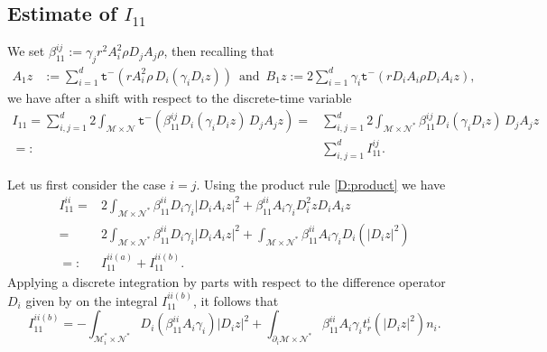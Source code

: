 \documentclass[11pt,oneside,leqno]{amsart}
\numberwithin{equation}{section}
\numberwithin{equation}{section}
\newcommand{\trm}{\mathtt t^-}
\begin{document}
\subsection{Estimate of $I_{11}$ }
We set $\beta_{11}^{ij}:=\gamma_{j}r^{2}A_{i}^{2}\rho D_{j}A_{j}\rho$, then recalling that
\begin{equation*}
    \begin{split}
        A_{1}z&:=\sum_{i=1}^{d}\trm(rA_{i}^{2}\rho\,D_{i}(\gamma_{i}D_{i}z))\, \text{ and }\,B_{1}z:=2\sum_{i=1}^{d}\gamma_{i}\trm(rD_{i}A_{i}\rho D_{i}A_{i}z),
    \end{split}
\end{equation*}
we have after a shift with respect to the discrete-time variable
\begin{equation*}
    \begin{split}
     I_{11}=\sum_{i,j= 1}^{d}2\int_{\mathcal{M}\times\mathcal{N}} \trm(\beta_{11}^{ij}D_{i}(\gamma_{i}D_{i}z)\,D_{j}A_{j}z)=&\sum_{i,j=1}^{d}2\int_{\mathcal{M}\times\mathcal{N}^{\ast}} \beta_{11}^{ij}D_{i}(\gamma_{i}D_{i}z)\,D_{j}A_{j}z\\
    =:&\sum_{i,j=1}^{d}I_{11}^{ij}.
    \end{split}
\end{equation*}
\par Let us first consider the case $i=j$. Using the product rule \eqref{D:product} we have
\begin{equation*}
\begin{split}
    I_{11}^{ii}=&2\int_{\mathcal{M}\times\mathcal{N}^{\ast}} \beta_{11}^{ii}D_{i}\gamma_{i}|D_{i}A_{i}z|^{2}+\beta_{11}^{ii}A_{i}\gamma_{i}D_{i}^{2}zD_{i}A_{i}z\\
    =&2\int_{\mathcal{M}\times\mathcal{N}^{\ast}} \beta_{11}^{ii}D_{i}\gamma_{i}|D_{i}A_{i}z|^{2}+\int_{\mathcal{M}\times\mathcal{N}^{\ast}} \beta_{11}^{ii}A_{i}\gamma_{i}D_{i}(|D_{i}z|^{2})\\
    =:&I_{11}^{ii(a)}+I_{11}^{ii(b)}.
    \end{split}
\end{equation*}
Applying a discrete integration by parts with respect to the difference operator $D_{i}$ given by \cite[Lemma 2.2, equation (15)]{LDOP-2021} on the integral $I_{11}^{ii(b)}$, it follows that
\begin{equation*}
    I_{11}^{ii(b)}=-\int_{\mathcal{M}^{\ast}_{i}\times\mathcal{N}^{\ast}} D_{i}(\beta_{11}^{ii}A_{i}\gamma_{i})|D_{i}z|^{2}+\int_{\partial_{i}\mathcal{M}\times\mathcal{N}^{\ast}}\beta_{11}^{ii}A_{i}\gamma_{i}t_{r}^{i}(|D_{i}z|^{2})n_{i}.
\end{equation*}
\end{document}
